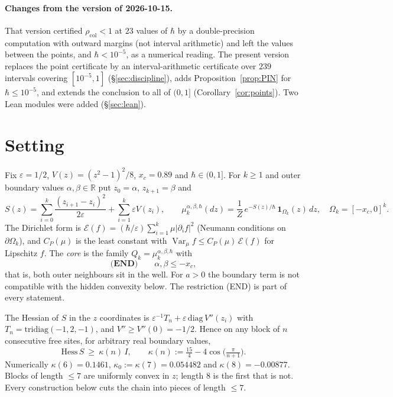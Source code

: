 \documentclass[11pt,a4paper]{article}
\theoremstyle{definition}
\theoremstyle{remark}
\newcommand{\R}{\mathbb{R}}
\newcommand{\Var}{\operatorname{Var}}
\newcommand{\cE}{\mathcal{E}}
\newcommand{\xc}{x_c}
\newcommand{\rcol}{\rho_{\mathrm{col}}}
\begin{document}
\paragraph{Changes from the version of 2026-10-15.} That version certified $\rcol<1$ at $23$ values of $\hbar$ by a double-precision computation with outward margins (not interval arithmetic) and left the values between the points, and $\hbar<10^{-5}$, as a numerical reading. The present version replaces the point certificate by an interval-arithmetic certificate over $239$ intervals covering $[10^{-5},1]$ (\S\ref{sec:discipline}), adds Proposition~\ref{prop:PIN} for $\hbar\le10^{-5}$, and extends the conclusion to all of $(0,1]$ (Corollary~\ref{cor:points}). Two Lean modules were added (\S\ref{sec:lean}).

\section{Setting}\label{sec:setting}

Fix $\varepsilon=1/2$, $V(z)=(z^2-1)^2/8$, $\xc=0.89$ and $\hbar\in(0,1]$. For $k\ge1$ and outer boundary values $\alpha,\beta\in\R$ put $z_0=\alpha$, $z_{k+1}=\beta$ and
\[
S(z)=\sum_{i=0}^{k}\frac{(z_{i+1}-z_i)^2}{2\varepsilon}+\sum_{i=1}^{k}\varepsilon V(z_i),\qquad
\mu_k^{\alpha,\beta,\hbar}(dz)=\frac{1}{Z}\,e^{-S(z)/\hbar}\,\mathbf 1_{\Omega_k}(z)\,dz,\quad \Omega_k=[-\xc,0]^k .
\]
The Dirichlet form is $\cE(f)=(\hbar/\varepsilon)\sum_{i=1}^k\mu|\partial_if|^2$ (Neumann conditions on $\partial\Omega_k$), and $C_P(\mu)$ is the least constant with $\Var_\mu f\le C_P(\mu)\,\cE(f)$ for Lipschitz $f$. The \emph{core} is the family $Q_k=\mu_k^{\alpha,\beta,\hbar}$ with
\[
\textbf{(END)}\qquad \alpha,\beta\le-\xc ,
\]
that is, both outer neighbours sit in the well. For $a>0$ the boundary term is not compatible with the hidden convexity below. The restriction (END) is part of every statement.

The Hessian of $S$ in the $z$ coordinates is $\varepsilon^{-1}T_n+\varepsilon\,\mathrm{diag}\,V''(z_i)$ with $T_n=\mathrm{tridiag}(-1,2,-1)$, and $V''\ge V''(0)=-1/2$. Hence on any block of $n$ consecutive free sites, for arbitrary real boundary values,
\begin{equation}\label{eq:kappa}
\mathrm{Hess}\,S\ \ge\ \kappa(n)\,I,\qquad \kappa(n):=\tfrac{15}{4}-4\cos\!\big(\tfrac{\pi}{n+1}\big).
\end{equation}
Numerically $\kappa(6)=0.1461$, $\kappa_0:=\kappa(7)=0.054482$ and $\kappa(8)=-0.00877$. Blocks of length $\le7$ are uniformly convex in $z$; length $8$ is the first that is not. Every construction below cuts the chain into pieces of length $\le7$.
\end{document}

